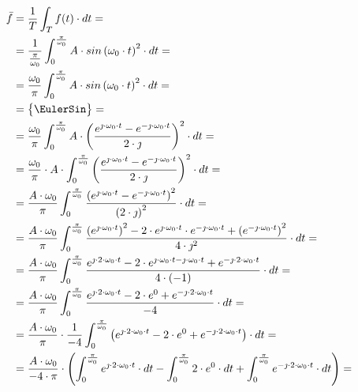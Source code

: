 \begin{task}
\begin{align*}
\bar{f} &=\frac{1}{T}\int_{T}^{} f(t) \cdot dt=\\
&=\frac{1}{\frac{\pi}{\omega_0}}\int_{0}^{\frac{\pi}{\omega_0}} A \cdot sin\left(\omega_0 \cdot t\right)^2 \cdot dt=\\
&=\frac{\omega_0}{\pi}\int_{0}^{\frac{\pi}{\omega_0}} A \cdot sin\left(\omega_0 \cdot t\right)^2 \cdot dt=\\
&=\begin{Bmatrix}\EulerSin\end{Bmatrix}=\\
&=\frac{\omega_0}{\pi}\int_{0}^{\frac{\pi}{\omega_0}} A \cdot \left( \frac{e^{\jmath \cdot \omega_0 \cdot t}-e^{-\jmath \cdot \omega_0 \cdot t}}{2 \cdot \jmath} \right)^2 \cdot dt=\\
&=\frac{\omega_0}{\pi} \cdot  A \cdot \int_{0}^{\frac{\pi}{\omega_0}} \left( \frac{e^{\jmath \cdot \omega_0 \cdot t}-e^{-\jmath \cdot \omega_0 \cdot t}}{2 \cdot \jmath} \right)^2 \cdot dt=\\
&=\frac{A \cdot \omega_0}{\pi} \int_{0}^{\frac{\pi}{\omega_0}} \frac{\left(e^{\jmath \cdot \omega_0 \cdot t}-e^{-\jmath \cdot \omega_0 \cdot t}\right)^2}{\left(2 \cdot \jmath\right)^2}  \cdot dt=\\
&=\frac{A \cdot \omega_0}{\pi} \int_{0}^{\frac{\pi}{\omega_0}} \frac{\left(e^{\jmath \cdot \omega_0 \cdot t}\right)^2 -2 \cdot e^{\jmath \cdot \omega_0 \cdot t} \cdot e^{-\jmath \cdot \omega_0 \cdot t}+ \left(e^{-\jmath \cdot \omega_0 \cdot t}\right)^2}{4 \cdot \jmath^2}  \cdot dt=\\
&=\frac{A \cdot \omega_0}{\pi} \int_{0}^{\frac{\pi}{\omega_0}} \frac{e^{\jmath \cdot 2 \cdot \omega_0 \cdot t} -2 \cdot e^{\jmath \cdot \omega_0 \cdot t -\jmath \cdot \omega_0 \cdot t}+ e^{-\jmath \cdot 2 \cdot \omega_0 \cdot t}}{4 \cdot \left(-1\right)}  \cdot dt=\\
&=\frac{A \cdot \omega_0}{\pi} \int_{0}^{\frac{\pi}{\omega_0}} \frac{e^{\jmath \cdot 2 \cdot \omega_0 \cdot t} -2 \cdot e^{0}+ e^{-\jmath \cdot 2 \cdot \omega_0 \cdot t}}{-4} \cdot dt=\\
&=\frac{A \cdot \omega_0}{\pi} \cdot \frac{1}{-4} \int_{0}^{\frac{\pi}{\omega_0}} \left(e^{\jmath \cdot 2 \cdot \omega_0 \cdot t} -2 \cdot e^{0}+ e^{-\jmath \cdot 2 \cdot \omega_0 \cdot t}\right) \cdot dt=\\
&=\frac{A \cdot \omega_0}{-4 \cdot \pi} \cdot \left( \int_{0}^{\frac{\pi}{\omega_0}} e^{\jmath \cdot 2 \cdot \omega_0 \cdot t} \cdot dt - \int_{0}^{\frac{\pi}{\omega_0}}2 \cdot e^{0} \cdot dt +  \int_{0}^{\frac{\pi}{\omega_0}} e^{-\jmath \cdot 2 \cdot \omega_0 \cdot t} \cdot dt\right)=\\

\end{align*}
\end{task}
